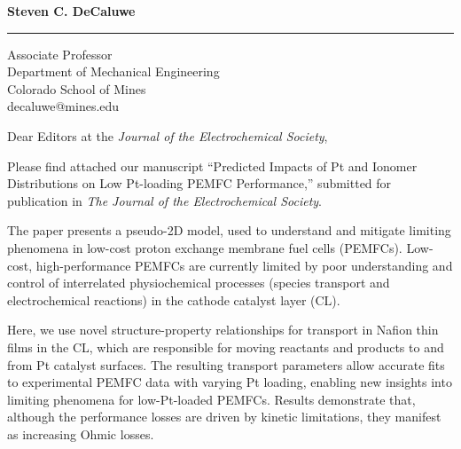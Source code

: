 \documentclass{letter} %
\begin{document}
\longindentation=0pt                       %
\let\raggedleft\raggedright                %
 
 
\begin{letter}{ }

\vspace{-20mm}
\begin{flushleft}
{\large\bf Steven C. DeCaluwe}
\end{flushleft}
\medskip\hrule height 1pt
\begin{flushright}
\hfill Associate Professor\\
\hfill Department of Mechanical Engineering \\
\hfill Colorado School of Mines \\
\hfill decaluwe@mines.edu\\
\end{flushright} 

\opening{Dear Editors at the {\it Journal of the Electrochemical Society},} 

\noindent Please find attached our manuscript ``Predicted Impacts of Pt and Ionomer Distributions on Low Pt-loading PEMFC Performance,'' submitted for publication in \emph{The Journal of the Electrochemical Society}. 

The paper presents a pseudo-2D model, used to understand and mitigate limiting phenomena in low-cost proton exchange membrane fuel cells (PEMFCs). Low-cost, high-performance PEMFCs are currently limited by poor understanding and control of interrelated physiochemical processes (species transport and electrochemical reactions) in the cathode catalyst layer (CL).  

Here, we use novel structure-property relationships for transport in Nafion thin films in the CL, which are responsible for moving reactants and products to and from Pt catalyst surfaces. The resulting transport parameters allow accurate fits to experimental PEMFC data with varying Pt loading, enabling new insights into limiting phenomena for low-Pt-loaded PEMFCs. Results demonstrate that, although the performance losses are driven by kinetic limitations, they manifest as increasing Ohmic losses. %


\end{letter}
\end{document}
